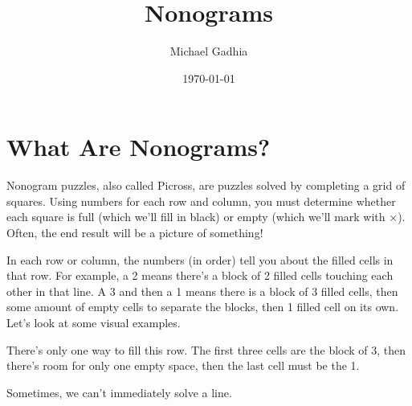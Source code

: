 \documentclass{article}
\title{Nonograms}
\author{Michael Gadhia}
\date{\today}
\makeatletter
\newcommand*\placex[2]{
    \LP@ingrid{#1}{#2}{\LP@NG@columns}{\LP@NG@rows}{nonogram}
    \LP@G@setcellcontent[hcenter,vcenter]{#1}{#2}{$\times$}
    }
\makeatother
\begin{document}
\maketitle

\section{What Are Nonograms?}

Nonogram puzzles, also called Picross, are puzzles solved by completing a grid of squares.
Using numbers for each row and column, you must determine whether each square is full (which we'll fill in black) or empty (which we'll mark with $\times$).
Often, the end result will be a picture of something!

In each row or column, the numbers (in order) tell you about the filled cells in that row.
For example, a 2 means there's a block of 2 filled cells touching each other in that line.
A 3 and then a 1 means there is a block of 3 filled cells, then some amount of empty cells to separate the blocks, then 1 filled cell on its own.
Let's look at some visual examples.

\begin{center}
    \begin{nonogram}[rows=1,columns=5,scale=0.35,width=3cm,
        fontsize=footnotesize,helplines=5,extracells=2, solution=true]
    \end{nonogram}
\end{center}

There's only one way to fill this row.
The first three cells are the block of 3, then there's room for only one empty space, then the last cell must be the 1.

\begin{center}
    \begin{nonogram}[rows=1,columns=5,scale=0.35,width=3cm,
        fontsize=footnotesize,helplines=5,extracells=2, solution=true]
        \placex{4}{1}
    \end{nonogram}
\end{center}

Sometimes, we can't immediately solve a line.

\begin{center}
    \begin{nonogram}[rows=1,columns=10,scale=0.35,width=3cm,
        fontsize=footnotesize,helplines=5,extracells=2, solution=true]
    \end{nonogram}
\end{center}
\end{document}
